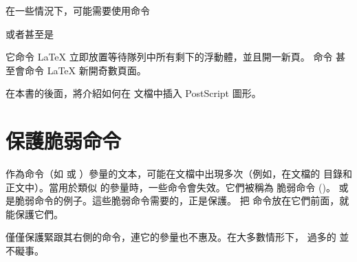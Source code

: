在一些情況下，可能需要使用命令

\begin{lscommand}
 或者甚至是 
\end{lscommand}

\noindent
它命令 \LaTeX{} 立即放置等待隊列中所有剩下的浮動體，並且開一新頁。
命令  甚至會命令 \LaTeX{} 新開奇數頁面。

在本書的後面，將介紹如何在 \LaTeXe{} 文檔中插入 PostScript 圖形。

\section{保護脆弱命令}

作為命令（如  或 ）參量的文本，可能在文檔中出現多次（例如，在文檔的
目錄和正文中）。當用於類似  的參量時，一些命令會失效。它們被稱為
脆弱命令 ()。 或  是脆弱命令的例子。這些脆弱命令需要的，正是保護。%
把  命令放在它們前面，就能保護它們。

 僅僅保護緊跟其右側的命令，連它的參量也不惠及。在大多數情形下，
過多的  並不礙事。

